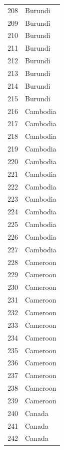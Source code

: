 \documentclass[
  letterpaper,
  DIV=11,
  numbers=noendperiod]{scrreprt}
\begin{document}
\begin{tabular}{ll}
208  &                   Burundi \\
209  &                   Burundi \\
210  &                   Burundi \\
211  &                   Burundi \\
212  &                   Burundi \\
213  &                   Burundi \\
214  &                   Burundi \\
215  &                   Burundi \\
216  &                  Cambodia \\
217  &                  Cambodia \\
218  &                  Cambodia \\
219  &                  Cambodia \\
220  &                  Cambodia \\
221  &                  Cambodia \\
222  &                  Cambodia \\
223  &                  Cambodia \\
224  &                  Cambodia \\
225  &                  Cambodia \\
226  &                  Cambodia \\
227  &                  Cambodia \\
228  &                  Cameroon \\
229  &                  Cameroon \\
230  &                  Cameroon \\
231  &                  Cameroon \\
232  &                  Cameroon \\
233  &                  Cameroon \\
234  &                  Cameroon \\
235  &                  Cameroon \\
236  &                  Cameroon \\
237  &                  Cameroon \\
238  &                  Cameroon \\
239  &                  Cameroon \\
240  &                    Canada \\
241  &                    Canada \\
242  &                    Canada \\

\end{tabular}
\end{document}
